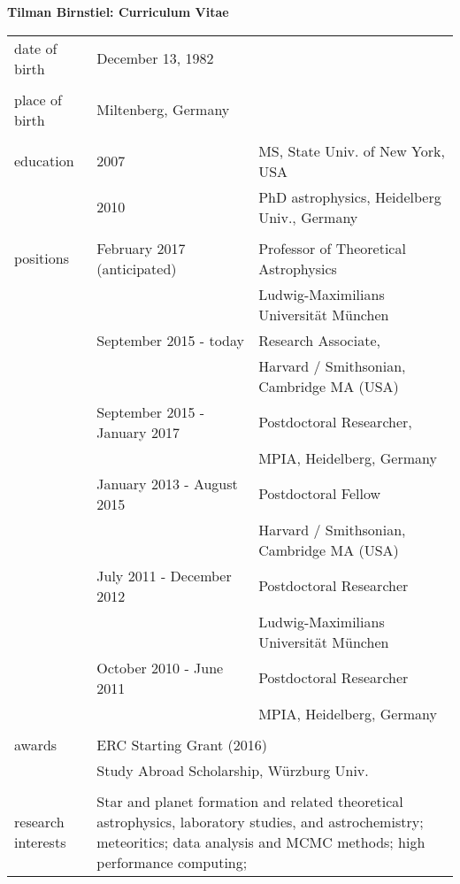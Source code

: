 \documentclass[10pt,fleqn,twoside]{article}
\begin{document}
\noindent

{\bf\large Tilman Birnstiel: Curriculum Vitae}

\begin{table}[h!]
\small
\begin{tabular}{lll}

{\sc date of birth}      & \multicolumn{2}{l}{December  13, 1982} \\
& & \\
{\sc place of birth}     & \multicolumn{2}{l}{Miltenberg, Germany} \\
& & \\
{\sc education}          & 2007       & MS, State Univ. of New York, USA\\
                         		& 2010       & PhD astrophysics, Heidelberg Univ., Germany \\
& & \\
{\sc positions}   & February 2017 (anticipated) & Professor of Theoretical Astrophysics \\
                         &            & Ludwig-Maximilians Universit\"at M\"unchen   \\
                         & September 2015 - today  & Research Associate,\\
                         &            & Harvard / Smithsonian, Cambridge MA (USA)\\
                         & September 2015 - January 2017  & Postdoctoral Researcher,\\
                         &            & MPIA, Heidelberg, Germany\\
                         & January 2013 - August 2015  & Postdoctoral Fellow \\
                         &            & Harvard / Smithsonian, Cambridge MA (USA)\\
                         & July 2011 - December 2012  & Postdoctoral Researcher \\
                         &            & Ludwig-Maximilians Universit\"at M\"unchen   \\
                         & October 2010 - June 2011  & Postdoctoral Researcher\\
                         &            & MPIA, Heidelberg, Germany\\
& & \\
{\sc awards}        & \multicolumn{2}{l}{ERC Starting Grant (2016) }\\
& \multicolumn{2}{l}{Study Abroad Scholarship, Würzburg Univ.}\\
 & & \\
{\sc research interests} & \multicolumn{2}{p{11.7cm}}{
Star and planet formation and related theoretical astrophysics, laboratory studies, and astrochemistry; meteoritics; data analysis and MCMC methods; high performance computing;
} \\
\end{tabular}
\end{table}
\end{document}
